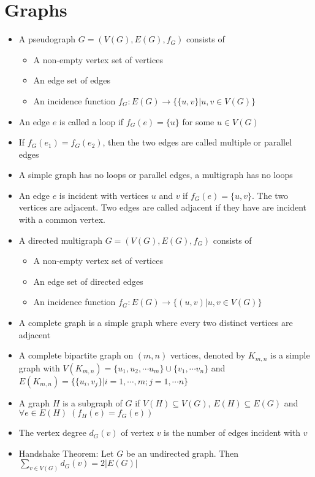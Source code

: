 \documentclass[11pt, twocolumn]{article}
\newenvironment{compactitem}
{\begin{itemize}
  \setlength{\itemsep}{1px}
  \setlength{\parskip}{0pt}
  \setlength{\parsep}{0pt}}
{\end{itemize}}
\begin{document}
\section{Graphs}
\begin{compactitem}
\item A pseudograph $G = (V(G), E(G), f_G)$ consists of 
\begin{compactitem}
\item A non-empty vertex set of vertices
\item An edge set of edges
\item An incidence function $f_G: E(G) \rightarrow \{\{u, v\}|u, v\in V(G)\}$
\end{compactitem}
\item An edge $e$ is called a loop if $f_G(e) = \{u\}$ for some $u\in V(G)$
\item If $f_G(e_1) = f_G(e_2)$, then the two edges are called multiple or parallel edges
\item A simple graph has no loops or parallel edges, a multigraph has no loops
\item An edge $e$ is incident with vertices $u$ and $v$ if $f_G(e) = \{ u, v \}$. The two vertices are adjacent. Two edges are called adjacent if they have are incident with a common vertex.
\item A directed multigraph $G = (V(G), E(G), f_G)$ consists of 
\begin{compactitem}
\item A non-empty vertex set of vertices
\item An edge set of directed edges
\item An incidence function $f_G: E(G) \rightarrow \{(u, v)|u, v\in V(G)\}$
\end{compactitem}
\item A complete graph is a simple graph where every two distinct vertices are adjacent
\item A complete bipartite graph on $(m, n)$ vertices, denoted by $K_{m,n}$ is a simple graph with $V(K_{m, n}) = \{u_1, u_2, \cdots u_m\} \cup \{v_1, \cdots v_n\}$ and $E(K_{m, n}) = \{\{u_i, v_j\}|i=1, \cdots, m; j = 1, \cdots n\}$
\item A graph $H$ is a subgraph of $G$ if $V(H)\subseteq V(G)$, $E(H) \subseteq E(G)$ and $\forall e\in E(H)\; (f_H(e) = f_G(e))$
\item The vertex degree $d_G(v)$ of vertex $v$ is the number of edges incident with $v$
\item Handshake Theorem: Let $G$ be an undirected graph. Then $\sum_{v\in V(G)} d_G(v) = 2|E(G)|$

\end{compactitem}
\end{document}
